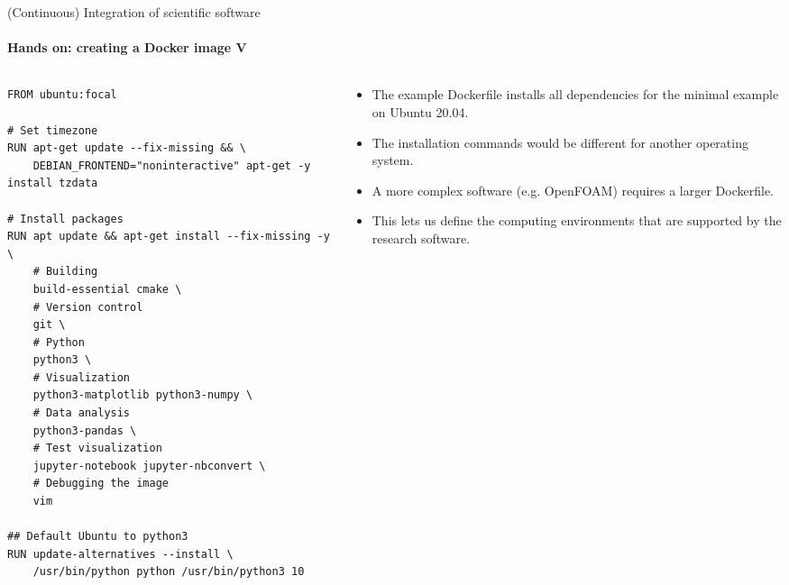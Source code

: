 \begin{frame}[fragile]{(Continuous) Integration of scientific software} 
    \framesubtitle{Hands on: creating a Docker image V} 
    \vfill
    \begin{columns}
        \begin{column}[c]{0.5\textwidth}
    \begin{verbatim}
FROM ubuntu:focal 

# Set timezone
RUN apt-get update --fix-missing && \
    DEBIAN_FRONTEND="noninteractive" apt-get -y install tzdata

# Install packages
RUN apt update && apt-get install --fix-missing -y \
    # Building
    build-essential cmake \
    # Version control
    git \
    # Python
    python3 \ 
    # Visualization
    python3-matplotlib python3-numpy \
    # Data analysis
    python3-pandas \
    # Test visualization
    jupyter-notebook jupyter-nbconvert \
    # Debugging the image 
    vim  

## Default Ubuntu to python3
RUN update-alternatives --install \
    /usr/bin/python python /usr/bin/python3 10 
    \end{verbatim}
        \end{column}
        \begin{column}[c]{0.5\textwidth}
            \begin{itemize}
                \item The example Dockerfile installs all dependencies for the minimal example on Ubuntu 20.04.
                \item The installation commands would be different for another operating system.  
                \item A more complex software (e.g. OpenFOAM) requires a larger Dockerfile.
                \item This lets us define the computing environments that are supported by the research software. 
            \end{itemize}
        \end{column}
    \end{columns}
\end{frame}

